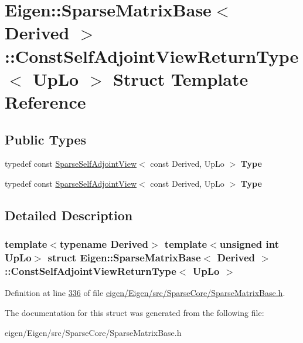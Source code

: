 \hypertarget{struct_eigen_1_1_sparse_matrix_base_1_1_const_self_adjoint_view_return_type}{}\section{Eigen\+:\+:Sparse\+Matrix\+Base$<$ Derived $>$\+:\+:Const\+Self\+Adjoint\+View\+Return\+Type$<$ Up\+Lo $>$ Struct Template Reference}
\label{struct_eigen_1_1_sparse_matrix_base_1_1_const_self_adjoint_view_return_type}
\subsection*{Public Types}
\begin{DoxyCompactItemize}
\item 
\mbox{\label{struct_eigen_1_1_sparse_matrix_base_1_1_const_self_adjoint_view_return_type_a1cc602fd26edeeaeb8d0d671230f7c2d}} 
typedef const \hyperlink{group___sparse_core___module_class_eigen_1_1_sparse_self_adjoint_view}{Sparse\+Self\+Adjoint\+View}$<$ const Derived, Up\+Lo $>$ {\bfseries Type}
\item 
\mbox{\label{struct_eigen_1_1_sparse_matrix_base_1_1_const_self_adjoint_view_return_type_a1cc602fd26edeeaeb8d0d671230f7c2d}} 
typedef const \hyperlink{group___sparse_core___module_class_eigen_1_1_sparse_self_adjoint_view}{Sparse\+Self\+Adjoint\+View}$<$ const Derived, Up\+Lo $>$ {\bfseries Type}
\end{DoxyCompactItemize}


\subsection{Detailed Description}
\subsubsection*{template$<$typename Derived$>$\newline
template$<$unsigned int Up\+Lo$>$\newline
struct Eigen\+::\+Sparse\+Matrix\+Base$<$ Derived $>$\+::\+Const\+Self\+Adjoint\+View\+Return\+Type$<$ Up\+Lo $>$}



Definition at line \hyperlink{eigen_2_eigen_2src_2_sparse_core_2_sparse_matrix_base_8h_source_l00336}{336} of file \hyperlink{eigen_2_eigen_2src_2_sparse_core_2_sparse_matrix_base_8h_source}{eigen/\+Eigen/src/\+Sparse\+Core/\+Sparse\+Matrix\+Base.\+h}.



The documentation for this struct was generated from the following file\+:\begin{DoxyCompactItemize}
\item 
eigen/\+Eigen/src/\+Sparse\+Core/\+Sparse\+Matrix\+Base.\+h\end{DoxyCompactItemize}
